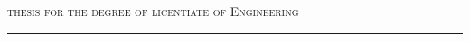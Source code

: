 \documentclass[
  paper=16.9cm:23.9cm,
  pagesize,
  twoside,
  10pt,
  chapterprefix,
  headsepline=on,
  footinclude=off,
  DIV=18,
  BCOR=7mm,
  bibliography=totoc,
  numbers=noenddot,
  open=right,
]{scrreprt}
\newcommand{\TheThesisTypeLong}{Licentiate of Engineering}
\newcommand{\TheThesisTypeLong}{Doctor of Philosophy}
\begin{document}
\pagestyle{plain.scrheadings}

%


\eject\pdfpagewidth=34.4cm

\eject
\pdfpagewidth=16.9cm
\restoregeometry

\thispagestyle{empty}

\noindent\begin{minipage}[t][3cm][t]{\textwidth}
    \begin{center}
    \textsc{thesis for the degree of \MakeLowercase\TheThesisTypeLong}
    \vspace{0.5cm}
    \hrule
    \end{center}
\end{minipage}

\noindent\begin{minipage}[t][4cm][t]{\textwidth}
    \begin{center}
    {\LARGE {\TitlePageTitle}\par}
    \ifdefined \ISSNPageSubitle \if \ISSNPageSubitle\empty\else
        \vspace{.2 cm}
        {\normalsize\textit{\TitlePageSubtitle}\par}
    \fi\fi
    \end{center}
\end{minipage}

\noindent\begin{minipage}{\textwidth}
    \begin{center}
    {\large\textsc{\TitlePageName}\par}
    \end{center}
\end{minipage}
\end{document}
